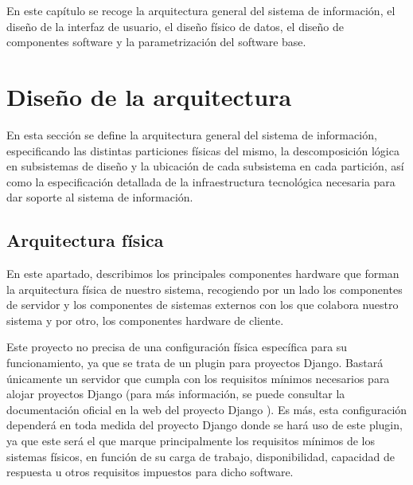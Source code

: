 

En este capítulo se recoge la arquitectura general del sistema de información,
el diseño de la interfaz de usuario, el diseño físico de datos, el diseño de
componentes software y la parametrización del software base.

\section{Diseño de la arquitectura}
En esta sección se define la arquitectura general del sistema de información,
especificando las distintas particiones físicas del mismo, la descomposición
lógica en subsistemas de diseño y la ubicación de cada subsistema en cada
partición, así como la especificación detallada de la infraestructura
tecnológica necesaria para dar soporte al sistema de información.

\subsection{Arquitectura física}

En este apartado, describimos los principales componentes hardware que forman la
arquitectura física de nuestro sistema, recogiendo por un lado los componentes
de servidor y los componentes de sistemas externos con los que colabora nuestro
sistema y por otro, los componentes hardware de cliente.

Este proyecto no precisa de una configuración física específica para su
funcionamiento, ya que se trata de un plugin para proyectos Django. Bastará
únicamente un servidor que cumpla con los requisitos mínimos necesarios para
alojar proyectos Django (para más información, se puede consultar la
documentación oficial en la web del proyecto Django \cite{djangobib}). Es más,
esta configuración dependerá en toda medida del proyecto Django donde se hará
uso de este plugin, ya que este será el que marque principalmente los requisitos
mínimos de los sistemas físicos, en función de su carga de trabajo,
disponibilidad, capacidad de respuesta u otros requisitos impuestos para dicho
software.

